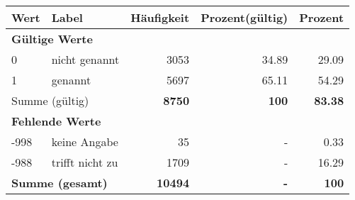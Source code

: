      \begin{longtable}{lXrrr}
     \toprule
     \textbf{Wert} & \textbf{Label} & \textbf{Häufigkeit} & \textbf{Prozent(gültig)} & \textbf{Prozent} \\
     \endhead
     \midrule
     \multicolumn{5}{l}{\textbf{Gültige Werte}}\\

     0 &
     \multicolumn{1}{X}{ nicht genannt   } &


       \num{3053} &
       \num[round-mode=places,round-precision=2]{34.89} &
         \num[round-mode=places,round-precision=2]{29.09} \\

     1 &
     \multicolumn{1}{X}{ genannt   } &


       \num{5697} &
       \num[round-mode=places,round-precision=2]{65.11} &
         \num[round-mode=places,round-precision=2]{54.29} \\
     \midrule
     \multicolumn{2}{l}{Summe (gültig)} &
       \textbf{\num{8750}} &
     \textbf{\num{100}} &
       \textbf{\num[round-mode=places,round-precision=2]{83.38}} \\
     \multicolumn{5}{l}{\textbf{Fehlende Werte}}\\
       -998 &
       keine Angabe &
         \num{35} &
        - &
         \num[round-mode=places,round-precision=2]{0.33} \\
       -988 &
       trifft nicht zu &
         \num{1709} &
        - &
         \num[round-mode=places,round-precision=2]{16.29} \\
     \midrule
     \multicolumn{2}{l}{\textbf{Summe (gesamt)}} &
          \textbf{\num{10494}} &
        \textbf{-} &
        \textbf{\num{100}} \\
     \bottomrule
     \end{longtable}
     

